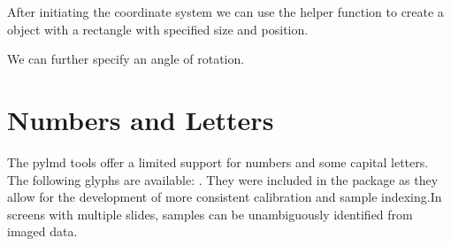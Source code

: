 \documentclass[letterpaper,10pt,english,openany,oneside]{sphinxmanual}
\begin{document}
\sphinxAtStartPar
After initiating the coordinate system we can use the {\hyperref[\detokenize{pages/modules:lmd.tools.rectangle}]{}} helper function to create a {\hyperref[\detokenize{pages/modules:lmd.lib.Shape}]{}} object with a rectangle with specified size and position.

\begin{sphinxVerbatim}[commandchars=\\\{\}]
    
  
\end{sphinxVerbatim}

\noindent{}

\sphinxAtStartPar
We can further specify an angle of rotation.

\begin{sphinxVerbatim}[commandchars=\\\{\}]
       
  
\end{sphinxVerbatim}

\noindent{}


\section{Numbers and Letters}
\label{\detokenize{pages/quickstart:numbers-and-letters}}
\sphinxAtStartPar
The py\sphinxhyphen{}lmd tools offer a limited support for numbers and some capital letters. The following glyphs are available: . They were included in the package as they allow for the development of more consistent calibration and sample indexing.In screens with multiple slides, samples can be unambiguously identified from imaged data.
\end{document}

